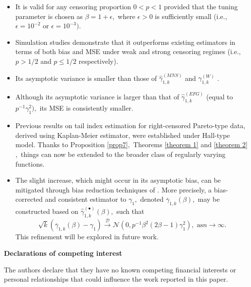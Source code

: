 \documentclass[reqno,openbib,runningheads,a4paper,12pt]{amsart}%
\begin{document}
\begin{itemize}
\item It is valid for any censoring proportion $0<p<1$ provided that the
tuning parameter is chosen as $\beta=1+\epsilon,$ where $\epsilon>0$ is
sufficiently small (i.e., $\epsilon=10^{-2}$ or $\epsilon=10^{-3}).$

\item Simulation studies demonstrate that it outperforms existing estimators
in terms of both bias and MSE under weak and strong censoring regimes (i.e.,
$p>1/2$ and $p\leq1/2$ respectively).

\item Its asymptotic variance is smaller than those of $\widehat{\gamma}%
_{1,k}^{\left(  MNS\right)  }$ \citep[] []{MNS2025} and $\gamma_{1,k}^{\left(
W\right)  }$ \citep[] []{WW2014}.

\item Although its asymptotic variance is larger than that of $\widehat{\gamma
}_{1,k}^{\left(  EFG\right)  }$\citep[] []{EnFG08} (equal to $p^{-1}\gamma
_{1}^{2}),$ its MSE is consistently smaller.

\item Previous results on tail index estimation for right-censored Pareto-type
data, derived using Kaplan-Meier estimator, were established under Hall-type
model. Thanks to Proposition \ref{prop7}$,$ Theorems \ref{theorem 1} and
\ref{theorem 2}$,$ things can now be extended to the broader class of
regularly varying functions.

\item The slight increase, which might occur in its asymptotic bias, can be
mitigated through bias reduction techniques of
\citep[see, e.g.,] []{Caeiro2005}. More precisely, a bias-corrected and
consistent estimator to $\gamma_{1},$ denoted $\overline{\gamma}_{1,k}\left(
\beta\right)  ,$ may be constructed based on $\widehat{\gamma}_{1,k}^{\left(
\bullet\right)  }\left(  \beta\right)  ,$ such that
\[
\sqrt{k}\left(  \overline{\gamma}_{1,k}\left(  \beta\right)  -\gamma
_{1}\right)  \overset{\mathcal{D}}{\rightarrow}\mathcal{N}\left(
0,p^{-1}\beta^{2}\left(  2\beta-1\right)  \gamma_{1}^{2}\right)  ,\text{ as
}n\rightarrow\infty.
\]
This refinement will be explored in future work.\textbf{\medskip}
\end{itemize}

\noindent\textbf{Declarations of competing interest\smallskip}

\noindent The authors declare that they have no known competing financial
interests or personal relationships that could influence the work reported in
this paper.
\end{document}
